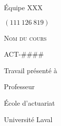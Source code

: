 

% 

\makeatletter
\begin{titlepage}
\centering \large
\begin{flushright}
Équipe XXX
\end{flushright}

\@author
\par
$(111 \ 126 \ 819)$
\vspace{0.5cm}




\vfill


{
\scshape
Nom du cours
\par
ACT-####
}
\vfill


{
\bfseries \Large
\@title
}
\vfill


Travail présenté à
\par
Professeur
\vfill

École d'actuariat
\par
Université Laval
\par 
\@date
\end{titlepage}
\makeatother
